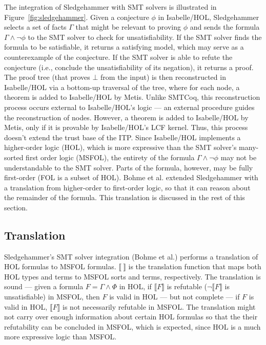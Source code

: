 \documentclass[11pt]{article}
\begin{document}
	The integration of Sledgehammer 
	with SMT solvers is illustrated in 
	Figure~\ref{fig:sledgehammer}. Given 
	a conjecture $\phi$ in 
	Isabelle/HOL, Sledgehammer 
	selects a set of facts 
	$\Gamma$ that might be relevant 
	to proving $\phi$ and sends
	the formula $\Gamma \land \neg 
	\phi$ to the SMT solver to check 
	for unsatisfiability. If the SMT 
	solver finds the formula to be 
	satisfiable, it returns a satisfying 
	model, which may serve as a 
	counterexample 
	of the conjecture. If the SMT 
	solver is able to refute the 
	conjecture (i.e., conclude 
	the unsatisfiability of its 
	negation), it returns 
	a proof. The proof tree (that
	proves $\bot$ from the 
	input) is then reconstructed in 
	Isabelle/HOL via a bottom-up 
	traversal of the tree, where 
	for each node, a theorem is 
	added to Isabelle/HOL by Metis.
	Unlike SMTCoq, this reconstruction
	process occurs external to 
	Isabelle/HOL's logic ---
	an external procedure guides 
	the reconstruction of nodes. 
	However, a theorem is added to 
	Isabelle/HOL by Metis, only if it 
	is provable by Isabelle/HOL's LCF 
	kernel. Thus, this process doesn't
	extend the trust base of the ITP.
	Since Isabelle/HOL 
	implements a higher-order logic 
	(HOL), which 
	is more expressive than 
	the SMT solver's many-sorted
	first order logic (MSFOL),
	the entirety of the formula
	$\Gamma \land \neg \phi$ may not 
	be understandable to the SMT 
	solver. Parts of the formula,
	however, may be fully 
	first-order (FOL is 
	a subset of HOL). Bohme et al.
	extended Sledgehammer with 
	a translation from higher-order 
	to first-order logic, so that 
	it can reason about the remainder
	of the formula. This translation
	is discussed in the rest of this 
	section.
	
	\subsection{Translation}
	\label{sec:trans}
	Sledgehammer's SMT solver 
	integration (Bohme et al.) performs 
	a translation 
	of HOL formulas to MSFOL formulas.
	$\llbracket\ \rrbracket$
	is the translation function 
	that maps both HOL types and 
	terms to MSFOL sorts and terms,
	respectively.
	The translation is sound --- 
	given a formula 
	$F = \Gamma \land \Phi$ in HOL, if 
	$\llbracket F \rrbracket$ is refutable 
	($\neg \llbracket F \rrbracket$
	is unsatisfiable) in MSFOL, then 
	$F$	is valid in HOL --- but not 
	complete --- if $F$ is valid in 
	HOL, $\llbracket F \rrbracket$ is 
	not necessarily refutable in MSFOL. 
	The translation might not carry over 
	enough information about certain HOL 
	formulas so that the their 
	refutability can be concluded in 
	MSFOL, which is	expected, since HOL 
	is a much more expressive logic than 
	MSFOL. 
	
\end{document}
